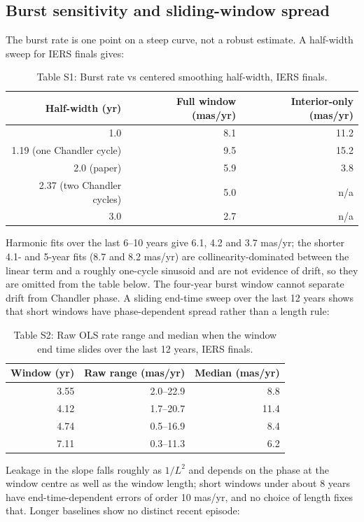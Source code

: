 \documentclass[11pt,a4paper]{article}
\begin{document}
\subsection{Burst sensitivity and sliding-window spread}

The burst rate is one point on a steep curve, not a robust estimate. A half-width sweep for IERS finals gives:

\begin{table}[ht]
\centering
\caption*{Table S1: Burst rate vs centered smoothing half-width, IERS finals.}
\begin{tabular}{rrr}
\toprule
Half-width (yr) & Full window (mas/yr) & Interior-only (mas/yr) \\
\midrule
1.0 & 8.1 & 11.2 \\
1.19 (one Chandler cycle) & 9.5 & 15.2 \\
2.0 (paper) & 5.9 & 3.8 \\
2.37 (two Chandler cycles) & 5.0 & n/a \\
3.0 & 2.7 & n/a \\
\bottomrule
\end{tabular}
\end{table}

Harmonic fits over the last 6--10 years give 6.1, 4.2 and 3.7 mas/yr; the shorter 4.1- and 5-year fits (8.7 and 8.2 mas/yr) are collinearity-dominated between the linear term and a roughly one-cycle sinusoid and are not evidence of drift, so they are omitted from the table below. The four-year burst window cannot separate drift from Chandler phase. A sliding end-time sweep over the last 12 years shows that short windows have phase-dependent spread rather than a length rule:

\begin{table}[ht]
\centering
\caption*{Table S2: Raw OLS rate range and median when the window end time slides over the last 12 years, IERS finals.}
\begin{tabular}{rrr}
\toprule
Window (yr) & Raw range (mas/yr) & Median (mas/yr) \\
\midrule
3.55 & 2.0--22.9 & 8.8 \\
4.12 & 1.7--20.7 & 11.4 \\
4.74 & 0.5--16.9 & 8.4 \\
7.11 & 0.3--11.3 & 6.2 \\
\bottomrule
\end{tabular}
\end{table}

Leakage in the slope falls roughly as $1/L^2$ and depends on the phase at the window centre as well as the window length; short windows under about 8 years have end-time-dependent errors of order 10 mas/yr, and no choice of length fixes that. Longer baselines show no distinct recent episode:
\end{document}
